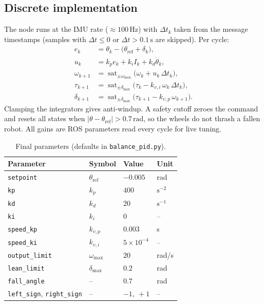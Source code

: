 \documentclass[11pt,a4paper]{article}
\begin{document}
\subsection{Discrete implementation}
The node runs at the IMU rate ($\approx100\,\mathrm{Hz}$) with $\Delta t_k$ taken
from the message timestamps (samples with $\Delta t\le0$ or $\Delta t>0.1\,\mathrm{s}$ are
skipped). Per cycle:
\begin{align}
  e_k &= \theta_k - \bigl(\theta_\mathrm{ref} + \delta_k\bigr), \\
  u_k &= k_p e_k + k_i I_k + k_d \dot\theta_k, \\
  \omega_{k+1} &= \operatorname{sat}_{\pm\omega_\mathrm{max}}\!\bigl(\omega_k + u_k\,\Delta t_k\bigr), \\
  \tau_{k+1} &= \operatorname{sat}_{\pm\delta_\mathrm{max}}\!\bigl(\tau_k - k_{v,i}\,\omega_k\,\Delta t_k\bigr), \\
  \delta_{k+1} &= \operatorname{sat}_{\pm\delta_\mathrm{max}}\!\bigl(\tau_{k+1} - k_{v,p}\,\omega_{k+1}\bigr).
\end{align}
Clamping the integrators gives anti-windup. A safety cutoff zeroes the command
and resets all states when $|\theta-\theta_\mathrm{ref}| > 0.7\,\mathrm{rad}$,
so the wheels do not thrash a fallen robot. All gains are ROS parameters read
every cycle for live tuning.

\begin{table}[ht]
\centering
\caption{Final parameters (defaults in \texttt{balance\_pid.py}).}
\begin{tabular}{@{}llll@{}}
\toprule
Parameter & Symbol & Value & Unit \\
\midrule
\texttt{setpoint}     & $\theta_\mathrm{ref}$ & $-0.005$ & rad \\
\texttt{kp}           & $k_p$ & $400$ & $\mathrm{s^{-2}}$ \\
\texttt{kd}           & $k_d$ & $20$ & $\mathrm{s^{-1}}$ \\
\texttt{ki}           & $k_i$ & $0$ & -- \\
\texttt{speed\_kp}    & $k_{v,p}$ & $0.003$ & s \\
\texttt{speed\_ki}    & $k_{v,i}$ & $5\times10^{-4}$ & -- \\
\texttt{output\_limit}& $\omega_\mathrm{max}$ & $20$ & rad/s \\
\texttt{lean\_limit}  & $\delta_\mathrm{max}$ & $0.2$ & rad \\
\texttt{fall\_angle}  & -- & $0.7$ & rad \\
\texttt{left\_sign}, \texttt{right\_sign} & -- & $-1,\ +1$ & -- \\
\bottomrule
\end{tabular}
\end{table}
\end{document}
